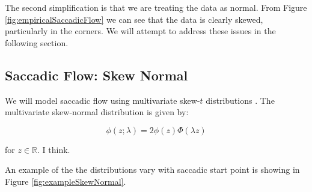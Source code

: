 \documentclass[a4paper, onecolumn, oneside, 11pt]{article}
\begin{document}
The second simplification is that we are treating the data as normal. From Figure \ref{fig:empiricalSaccadicFlow} we can see that the data is clearly skewed, particularly in the corners. We will attempt to address these issues in the following section.

\subsection{Saccadic Flow: Skew Normal}
We will model saccadic flow using multivariate skew-$t$ distributions \citep{azzalini2015}. The multivariate skew-normal distribution \citep{azzalini1996} is given by:

\begin{equation}
\phi(z; \lambda) = 2\phi(z)\Phi(\lambda z) 
\end{equation}

for $z \in \mathbb{R}$. I think. 


An example of the the distributions vary with saccadic start point is showing in Figure \ref{fig:exampleSkewNormal}.
\end{document}

